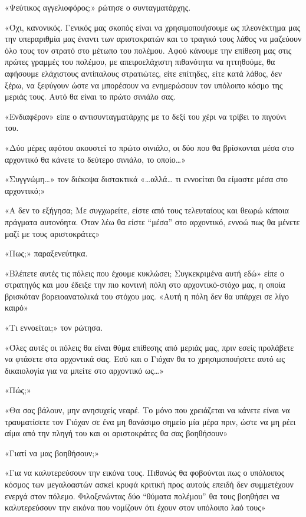 \documentclass[12pt,twoside, openany]{book}
\begin{document}
«Ψεύτικος αγγελιοφόρος;» ρώτησε ο συνταγματάρχης.

«Όχι, κανονικός. Γενικός μας σκοπός είναι να χρησιμοποιήσουμε ως πλεονέκτημα μας την υπεραριθμία μας έναντι των αριστοκρατών και το τραγικό τους λάθος να μαζεύουν όλο τους τον στρατό στο μέτωπο του πολέμου. Αφού κάνουμε την επίθεση μας στις πρώτες γραμμές του πολέμου, με απειροελάχιστη πιθανότητα να ηττηθούμε, θα αφήσουμε ελάχιστους αντίπαλους στρατιώτες, είτε επίτηδες, είτε κατά λάθος, δεν ξέρω, να ξεφύγουν ώστε να μπορέσουν να ενημερώσουν τον υπόλοιπο κόσμο της μεριάς τους. Αυτό θα είναι το πρώτο σινιάλο σας.

«Ενδιαφέρον» είπε ο αντισυνταγματάρχης με το δεξί του χέρι να τρίβει το πιγούνι του.

«Δύο μέρες αφότου ακουστεί το πρώτο σινιάλο, οι δύο που θα βρίσκονται μέσα στο αρχοντικό θα κάνετε το δεύτερο σινιάλο, το οποίο…»

«Συγγνώμη…» τον διέκοψα διστακτικά «…αλλά… τι εννοείται θα είμαστε μέσα στο αρχοντικό;»

«Α δεν το εξήγησα; Με συγχωρείτε, είστε από τους τελευταίους και θεωρώ κάποια πράγματα αυτονόητα. Όταν λέω θα είστε “μέσα” στο αρχοντικό, εννοώ πως θα μένετε μαζί με τους αριστοκράτες»

«Πως;» παραξενεύτηκα.

«Βλέπετε αυτές τις πόλεις που έχουμε κυκλώσει; Συγκεκριμένα αυτή εδώ» είπε ο στρατηγός και μου έδειξε την πιο κοντινή πόλη στο αρχοντικό-στόχο μας, η οποία βρισκόταν βορειοανατολικά του στόχου μας. «Αυτή η πόλη δεν θα υπάρχει σε λίγο καιρό»

«Τι εννοείται;» τον ρώτησα.

«Όλες αυτές οι πόλεις θα είναι θύμα επίθεσης από μεριάς μας, πριν εσείς προλάβετε να φτάσετε στα αρχοντικά σας. Εσύ και ο Γιόχαν θα το χρησιμοποιήσετε αυτό ως δικαιολογία για να μπείτε στο αρχοντικό ως…»

«Πώς;»

«Θα σας βάλουν, μην ανησυχείς νεαρέ. Το μόνο που χρειάζεται να κάνετε είναι να τραυματίσετε τον Γιόχαν σε ένα μη θανάσιμο σημείο μία μέρα πριν, ώστε να μη ρέει αίμα από την πληγή του και οι αριστοκράτες θα σας βοηθήσουν»

«Γιατί να μας βοηθήσουν;»

«Για να καλυτερεύσουν την εικόνα τους. Πιθανώς θα φοβούνται πως ο υπόλοιπος κόσμος των μεγαλοαστών ασκεί κρυφά κριτική προς αυτούς επειδή δεν συμμετέχουν ενεργά στον πόλεμο. Φιλοξενώντας δύο “θύματα πολέμου” θα τους βοηθήσει να καλυτερεύσουν την εικόνα που νομίζουν ότι έχουν στον υπόλοιπο λαό τους»
\end{document}
